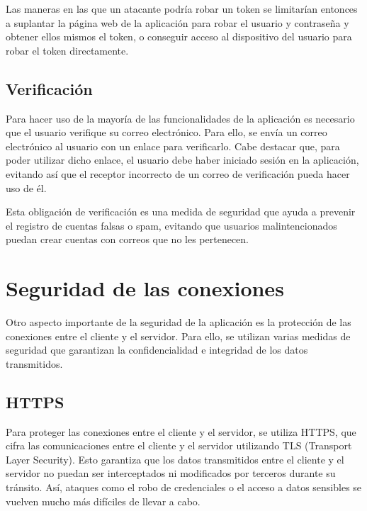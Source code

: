Las maneras en las que un atacante podría robar un token se limitarían entonces
a suplantar la página web de la aplicación para robar el usuario y contraseña y
obtener ellos mismos el token, o conseguir acceso al dispositivo del usuario
para robar el token directamente.

\subsection{Verificación}
\label{anexo4:sec:verificacion}
Para hacer uso de la mayoría de las funcionalidades de la aplicación es necesario que el usuario
verifique su correo electrónico. Para ello, se envía un correo electrónico al usuario con un
enlace para verificarlo. Cabe destacar que, para poder utilizar dicho enlace, el usuario debe
haber iniciado sesión en la aplicación, evitando así que el receptor incorrecto de un correo
de verificación pueda hacer uso de él.

Esta obligación de verificación es una medida de seguridad que ayuda a prevenir el registro de
cuentas falsas o spam, evitando que usuarios malintencionados puedan crear cuentas con correos
que no les pertenecen.


\section{Seguridad de las conexiones}
\label{anexo4:sec:conexiones}
Otro aspecto importante de la seguridad de la aplicación es la protección de las conexiones entre
el cliente y el servidor. Para ello, se utilizan varias medidas de seguridad que garantizan la
confidencialidad e integridad de los datos transmitidos.

\subsection{HTTPS}
\label{anexo4:sec:conexiones-https}
Para proteger las conexiones entre el cliente y el servidor, se utiliza HTTPS, que cifra las
comunicaciones entre el cliente y el servidor utilizando TLS (Transport Layer Security). Esto
garantiza que los datos transmitidos entre el cliente y el servidor no puedan ser interceptados ni
modificados por terceros durante su tránsito. Así, ataques como el robo de credenciales o el
acceso a datos sensibles se vuelven mucho más difíciles de llevar a cabo.

